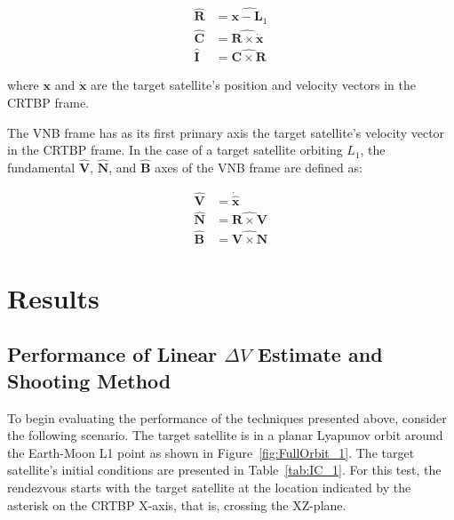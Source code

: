 \documentclass[letterpaper, preprint, paper,11pt]{AAS}	%
\begin{document}
\begin{equation*} \label{eq:RIC}
	\begin{aligned}
		\mathbf{\hat{R}} &= \widehat{\mathbf{x} - \mathbf{L}_1} \\
		\mathbf{\hat{C}} &= \widehat{\mathbf{R} \times \mathbf{\dot{x}}} \\
		\mathbf{\hat{I}} \, &= \widehat{\mathbf{C} \times \mathbf{R}}
	\end{aligned}
\end{equation*}

where \(\mathbf{x}\) and \(\mathbf{\dot{x}}\) are the target satellite's position and velocity vectors in the CRTBP frame.

The VNB frame has as its first primary axis the target satellite's velocity vector in the CRTBP frame.  In the case of a target satellite orbiting \(L_1\), the fundamental \(\mathbf{\hat{V}}\), \(\mathbf{\hat{N}}\), and \(\mathbf{\hat{B}}\) axes of the VNB frame are defined as:

\begin{equation*} \label{eq:VNB}
	\begin{aligned}
		\mathbf{\hat{V}} &= \mathbf{\dot{\hat{x}}} \\
		\mathbf{\hat{N}} &= \widehat{\mathbf{R} \times \mathbf{V}}  \\
		\mathbf{\hat{B}} &= \widehat{\mathbf{V} \times \mathbf{N}} 
	\end{aligned}
\end{equation*}

\section{Results}

\subsection{Performance of Linear \(\Delta V\) Estimate and Shooting Method}

To begin evaluating the performance of the techniques presented above, consider the following scenario.  The target satellite is in a planar Lyapunov orbit around the Earth-Moon L1 point as shown in Figure~\ref{fig:FullOrbit_1}.  The target satellite's initial conditions are presented in Table~\ref{tab:IC_1}.  For this test, the rendezvous starts with the target satellite at the location indicated by the asterisk on the CRTBP X-axis, that is, crossing the XZ-plane.
\end{document}
